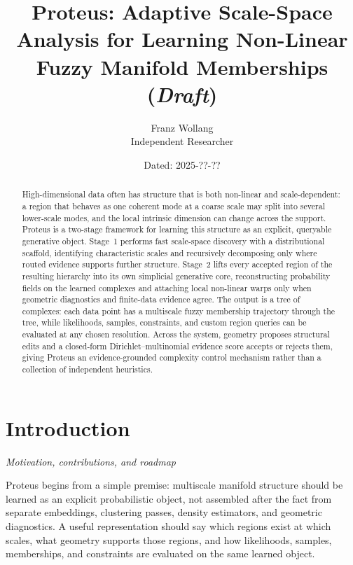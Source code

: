 \documentclass[11pt]{article}
\title{Proteus: Adaptive Scale-Space Analysis for Learning Non-Linear Fuzzy Manifold Memberships (\textit{Draft})}
\author{Franz Wollang\\ \small Independent Researcher}
\date{\small Dated: 2025-??-??}
\newcommand{\sectionsubtitle}[1]{\vspace{-0.25em}\noindent\textit{#1}\par\vspace{0.75em}}
\theoremstyle{definition}
\theoremstyle{plain}
\begin{document}
\maketitle

\begin{center}
\setlength{\fboxsep}{8pt}%
\end{center}
\vspace{1em}

\begin{abstract}
High-dimensional data often has structure that is both non-linear and scale-dependent: a region that behaves as one coherent mode at a coarse scale may split into several lower-scale modes, and the local intrinsic dimension can change across the support. Proteus is a two-stage framework for learning this structure as an explicit, queryable generative object. Stage~1 performs fast scale-space discovery with a distributional scaffold, identifying characteristic scales and recursively decomposing only where routed evidence supports further structure. Stage~2 lifts every accepted region of the resulting hierarchy into its own simplicial generative core, reconstructing probability fields on the learned complexes and attaching local non-linear warps only when geometric diagnostics and finite-data evidence agree. The output is a tree of complexes: each data point has a multiscale fuzzy membership trajectory through the tree, while likelihoods, samples, constraints, and custom region queries can be evaluated at any chosen resolution. Across the system, geometry proposes structural edits and a closed-form Dirichlet--multinomial evidence score accepts or rejects them, giving Proteus an evidence-grounded complexity control mechanism rather than a collection of independent heuristics.
\end{abstract}

\section{Introduction}
\label{sec:intro}
\sectionsubtitle{Motivation, contributions, and roadmap}

Proteus begins from a simple premise: multiscale manifold structure should be learned as an explicit probabilistic object, not assembled after the fact from separate embeddings, clustering passes, density estimators, and geometric diagnostics. A useful representation should say which regions exist at which scales, what geometry supports those regions, and how likelihoods, samples, memberships, and constraints are evaluated on the same learned object.
\end{document}
